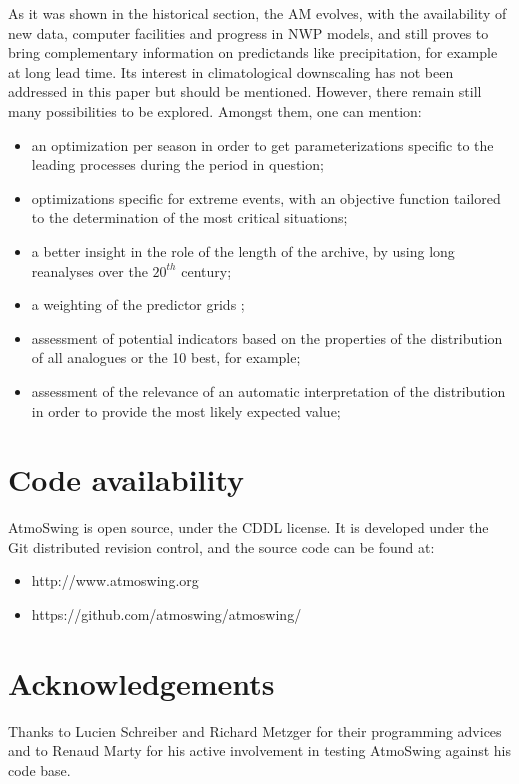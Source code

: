 \documentclass[review]{elsarticle}
\begin{document}
As it was shown in the historical section, the AM evolves, with the availability of new data, computer facilities and progress in NWP models, and still proves to bring complementary information on predictands like precipitation, for example at long lead time. Its interest in climatological downscaling has not been addressed in this paper but should be mentioned. However, there remain still many possibilities to be explored. Amongst them, one can mention:

\begin{itemize}
	\item an optimization per season in order to get parameterizations specific to the leading processes during the period in question;
	\item optimizations specific for extreme events, with an objective function tailored to the determination of the most critical situations;
	\item a better insight in the role of the length of the archive, by using long reanalyses over the $20^{th}$ century;	
	\item a weighting of the predictor grids \citep[see][]{Bliefernicht2010};
	\item assessment of potential indicators based on the properties of the distribution of all analogues or the 10 best, for example;
	\item assessment of the relevance of an automatic interpretation of the distribution in order to provide the most likely expected value;
\end{itemize}


\section*{Code availability}

AtmoSwing is open source, under the CDDL license. It is developed under the Git distributed revision control, and the source code can be found at:

\begin{itemize}
	\item http://www.atmoswing.org
	\item https://github.com/atmoswing/atmoswing/
\end{itemize}


\section*{Acknowledgements}
Thanks to Lucien Schreiber and Richard Metzger for their programming advices and to Renaud Marty for his active involvement in testing AtmoSwing against his code base.
\end{document}

